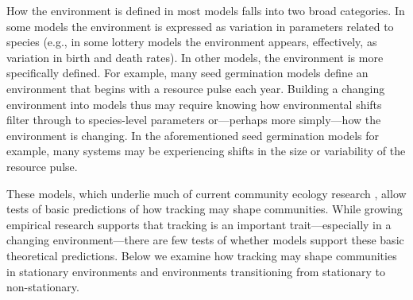 \documentclass[11pt,letterpaper]{article}
\begin{document}
How the environment is defined in most models falls into two broad categories. In some models the environment is expressed as variation in parameters related to species (e.g., in some lottery models the environment appears, effectively, as variation in birth and death rates). In other models, the environment is more specifically defined. For example, many seed germination models define an environment that begins with a resource pulse each year. Building a changing environment into models thus may require knowing how environmental shifts filter through to species-level parameters \citep{Tuljapurkar2009} or---perhaps more simply---how the environment is changing. In the aforementioned seed germination models for example, many systems may be experiencing shifts in the size or variability of the resource pulse. 

These models, which underlie much of current community ecology research \citep{Mayfield:2010fe,barabas2018,ellner2019}, allow tests of basic predictions of how tracking may shape communities. While growing empirical research supports that tracking is an important trait---especially in a changing environment---there are few tests of whether models support these basic theoretical predictions. Below we examine how tracking may shape communities in stationary environments and environments transitioning from stationary to non-stationary.
\end{document}
